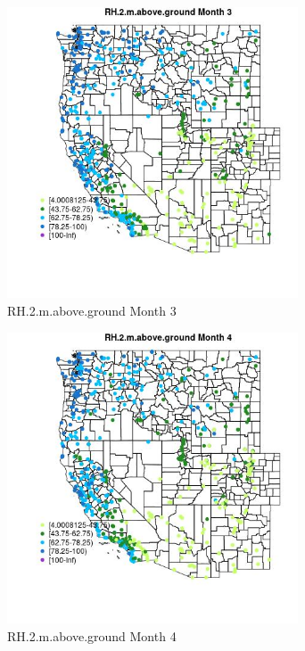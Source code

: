 \begin{figure} 
\centering  
\includegraphics[width=0.77\textwidth]{Code_Outputs/Report_ML_input_PM25_Step4_part_e_de_duplicated_aves_compiled_2019-05-14wNAs_MapObsMo3RH2maboveground.jpg} 
\caption{\label{fig:Report_ML_input_PM25_Step4_part_e_de_duplicated_aves_compiled_2019-05-14wNAsMapObsMo3RH2maboveground}RH.2.m.above.ground Month 3} 
\end{figure} 
 

\clearpage 

\begin{figure} 
\centering  
\includegraphics[width=0.77\textwidth]{Code_Outputs/Report_ML_input_PM25_Step4_part_e_de_duplicated_aves_compiled_2019-05-14wNAs_MapObsMo4RH2maboveground.jpg} 
\caption{\label{fig:Report_ML_input_PM25_Step4_part_e_de_duplicated_aves_compiled_2019-05-14wNAsMapObsMo4RH2maboveground}RH.2.m.above.ground Month 4} 
\end{figure} 
 

